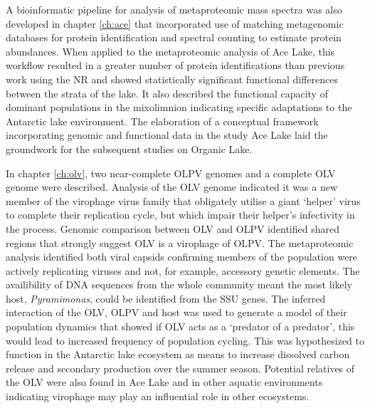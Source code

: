 A bioinformatic pipeline for analysis of metaproteomic mass spectra was also developed in chapter \ref{ch:ace} that incorporated use of matching metagenomic databases for protein identification and spectral counting to estimate protein abundances.
When applied to the metaproteomic analysis of Ace Lake, this workflow resulted in a greater number of protein identifications than previous work using the \ac{NR} and showed statistically significant functional differences between the strata of the lake.
It also described the functional capacity of dominant populations in the mixolimnion indicating specific adaptations to the Antarctic lake environment.
The elaboration of a conceptual framework incorporating genomic and functional data in the study Ace Lake laid the groundwork for the subsequent studies on Organic Lake.

In chapter \ref{ch:olv}, two near-complete \ac{OLPV} genomes and a complete \ac{OLV} genome were described.
Analysis of the \ac{OLV} genome indicated it was a new member of the virophage virus family that obligately utilise a  giant `helper' virus to complete their replication cycle, but which impair their helper's infectivity in the process.
Genomic comparison between \ac{OLV} and \ac{OLPV} identified shared regions that strongly suggest \ac{OLV} is a virophage of \ac{OLPV}.
The metaproteomic analysis identified both viral capsids confirming members of the population were actively replicating viruses and not, for example, accessory genetic elements.
The availibility of \textsc{DNA} sequences from the whole community meant the most likely host, \emph{Pyramimonas}, could be identified from the \ac{SSU} genes.
The inferred interaction of the \ac{OLV}, \ac{OLPV} and host was used to generate a model of their population dynamics that showed if \ac{OLV} acts as a `predator of a predator', this would lead to increased frequency of population cycling.
This was hypothesized to function in the Antarctic lake ecosystem as means to increase dissolved carbon release and secondary production over the summer season.
Potential relatives of the \ac{OLV} were also found in Ace Lake and in other aquatic environments indicating virophage may play an influential role in other ecosystems.

